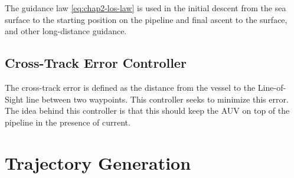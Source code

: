 		The guidance law \eqref{eq:chap2-los-law} is used in the initial descent from the sea surface to the starting position on the pipeline and final ascent to the surface, and other long-distance guidance.
		
	\subsection{Cross-Track Error Controller}
		The cross-track error is defined as the distance from the vessel to the Line-of-Sight line between two waypoints. This controller seeks to minimize this error. The idea behind this controller is that this should keep the AUV on top of the pipeline in the presence of current. 
	
	
\section{Trajectory Generation}

	
